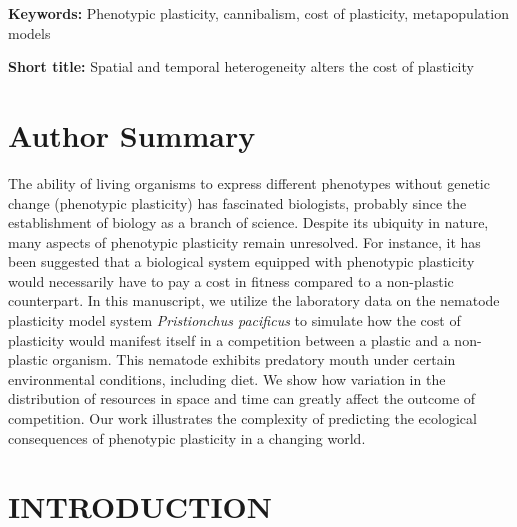 \documentclass[10pt,letterpaper]{article}
\begin{document}
\hspace{5cm}

\noindent
\textbf{Keywords:} Phenotypic plasticity, cannibalism, cost of plasticity, metapopulation models

\noindent
\textbf{Short title:} Spatial and temporal heterogeneity alters the cost of plasticity 

\section*{Author Summary}

The ability of living organisms to express different phenotypes without genetic change (phenotypic plasticity) has fascinated biologists, probably since the establishment of biology as a branch of science. Despite its ubiquity in nature, many aspects of phenotypic plasticity remain unresolved. For instance, it has been suggested that a biological system equipped with phenotypic plasticity would necessarily have to pay a cost in fitness compared to a non-plastic counterpart. In this manuscript, we utilize the laboratory data on the nematode plasticity model system \emph{Pristionchus pacificus} to simulate how the cost of plasticity would manifest itself in a competition between a plastic and a non-plastic organism. This nematode exhibits predatory mouth under certain environmental conditions, including diet. We show how variation in the distribution of resources in space and time can greatly affect the outcome of competition. Our work illustrates the complexity of predicting the ecological consequences of phenotypic plasticity in a changing world. 
\linenumbers




\section*{INTRODUCTION}


\end{document}
